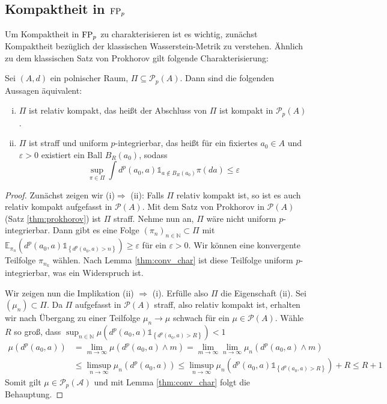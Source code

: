 \subsection{Kompaktheit in \texorpdfstring{$\operatorname{FP}_p$}{FPp}}
Um Kompaktheit in $\operatorname{FP}_p$ zu charakterisieren ist es wichtig, zunächst Kompaktheit bezüglich der klassischen Wasserstein-Metrik zu verstehen. Ähnlich zu dem klassischen Satz von Prokhorov gilt folgende Charakterisierung:
\begin{theorem}\label{thm:prokhorov_in_pp}
    Sei $(A, d)$ ein polnischer Raum, $\Pi\subseteq\mathcal{P}_p(A)$. Dann sind die folgenden Aussagen äquivalent:
    \begin{enumerate}[(i)]
        \item $\Pi$ ist relativ kompakt, das heißt der Abschluss von $\Pi$ ist kompakt in $\mathcal{P}_p(A)$.
        \item $\Pi$ ist straff und uniform $p$-integrierbar, das heißt für ein fixiertes $a_0 \in A$ und $\varepsilon>0$ existiert ein Ball $B_R(a_0)$, sodass
        $$\sup_{\pi \in \Pi} \int d^p(a_0, a)\mathds{1}_{a \notin B_R(a_0)} \pi(da) \leq \varepsilon$$
    \end{enumerate}
\end{theorem}
\begin{proof}
     Zunächst zeigen wir (i)$\Rightarrow$ (ii): Falls $\Pi$ relativ kompakt ist, so ist es auch relativ kompakt aufgefasst in $\mathcal{P}(A)$. Mit dem Satz von Prokhorov in $\mathcal{P}(A)$ (Satz \ref{thm:prokhorov}) ist $\Pi$ straff. Nehme nun an, $\Pi$ wäre nicht uniform $p$-integrierbar. Dann gibt es eine Folge $(\pi_n)_{n\in\mathbb{N}} \subset \Pi$ mit $\mathbb{E}_{\pi_n}(d^p(a_0, a)\mathds{1}_{\left\{d^p(a_0, a)>n\right\}}) \geq \varepsilon$ für ein $\varepsilon>0$. Wir können eine konvergente Teilfolge $\pi_{n_k}$ wählen. Nach Lemma \ref{thm:conv_char} ist diese Teilfolge uniform $p$-integrierbar, was ein Widerspruch ist.

    Wir zeigen nun die Implikation (ii) $\Rightarrow$ (i). Erfülle also $\Pi$ die Eigenschaft (ii). Sei $(\mu_n)\subset \Pi$. Da $\Pi$ aufgefasst in $\mathcal{P}(A)$ straff, also relativ kompakt ist, erhalten wir nach Übergang zu einer Teilfolge $\mu_n \rightarrow \mu$ schwach für ein $\mu \in \mathcal{P}(A)$. 
    Wähle $R$ so groß, dass $\sup_{n\in\mathbb{N}}\mu(d^p(a_0, a)\mathds{1}_{\left\{d^p(a_0, a)>R\right\}})<1$
    \begin{align*}
        \mu(d^p(a_0, a)) &= \lim_{m\rightarrow\infty}\mu(d^p(a_0, a) \wedge m) = \lim_{m\rightarrow\infty}\lim_{n\rightarrow\infty} \mu_n(d^p(a_0, a)\wedge m) \\
        &\leq \limsup_{n\rightarrow\infty} \mu_n(d^p(a_0, a)) \leq \limsup_{n\rightarrow\infty} \mu_n(d^p(a_0, a) \mathds{1}_{\left\{d^p(a_0, a)>R\right\}}) + R \leq R+1
    \end{align*}
    Somit gilt $\mu \in \mathcal{P}_p(\mathcal{A})$ und mit Lemma \ref{thm:conv_char} folgt die Behauptung.
\end{proof}
